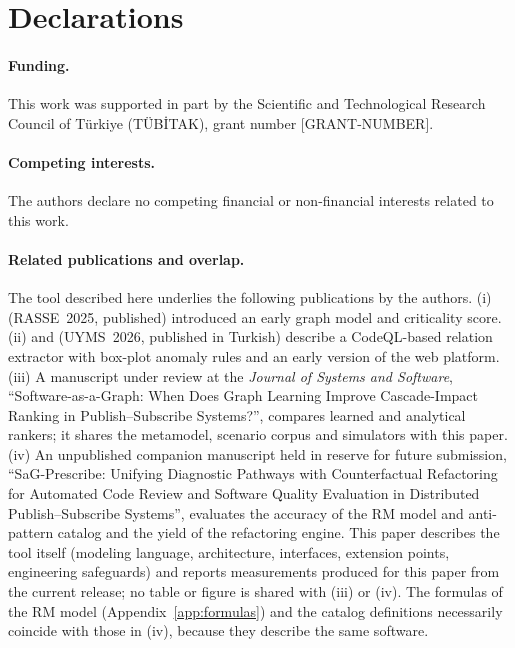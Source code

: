 \section*{Declarations}

\paragraph{Funding.} This work was supported in part by the Scientific and Technological Research Council of T\"urkiye (T\"UB\.ITAK), grant number [GRANT-NUMBER].

\paragraph{Competing interests.} The authors declare no competing financial or non-financial interests related to this work.

\paragraph{Related publications and overlap.} The tool described here underlies the following publications by the authors. (i) \citet{yigit2025graph} (RASSE~2025, published) introduced an early graph model and criticality score. (ii) \citet{caliskan2026uyms} and \citet{ersen2026uyms} (UYMS~2026, published in Turkish) describe a CodeQL-based relation extractor with box-plot anomaly rules and an early version of the web platform. (iii) A manuscript under review at the \emph{Journal of Systems and Software}, ``Software-as-a-Graph: When Does Graph Learning Improve Cascade-Impact Ranking in Publish--Subscribe Systems?'', compares learned and analytical rankers; it shares the metamodel, scenario corpus and simulators with this paper. (iv) An unpublished companion manuscript held in reserve for future submission, ``SaG-Prescribe: Unifying Diagnostic Pathways with Counterfactual Refactoring for Automated Code Review and Software Quality Evaluation in Distributed Publish--Subscribe Systems'', evaluates the accuracy of the RM model and anti-pattern catalog and the yield of the refactoring engine. This paper describes the tool itself (modeling language, architecture, interfaces, extension points, engineering safeguards) and reports measurements produced for this paper from the current release; no table or figure is shared with (iii) or (iv). The formulas of the RM model (Appendix~\ref{app:formulas}) and the catalog definitions necessarily coincide with those in (iv), because they describe the same software.

